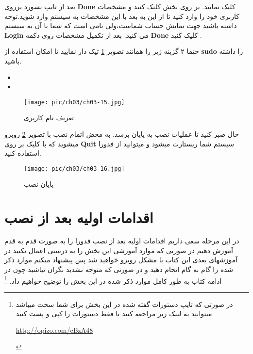 بعد از تایپ پسورد برروی 
 \textbf{Done}
 کلیک نمایید.
 بر روی بخش 
 کلیک کنید و مشخصات کاربری خود را وارد کنید تا از این به بعد با این مشخصات به سیستم وارد شوید.توجه داشته باشید 
 جهت نمایش حساب شماست،ولی 
 نامی است که شما با آن به سیستم 
 \textbf{Login}
  می کنید.   
 بعد از تکمیل مشخصات روی دکمه 
  \textbf{Done}
  کلیک کنید .
  \begin{tcolorbox}

حتما ۲ گزینه زیر را همانند تصویر
\ref{pic-15} \label{user-name}
تیک دار نمایید تا امکان استفاده از 
\textbf{sudo}
را داشته باشید.
\begin{LTR}
\begin{itemize}
	\item {}
	\item {}
\end{itemize}
\end{LTR}
  \end{tcolorbox}  
  \begin{figure}[H]%
  	\caption{تعریف نام کاربری}
  	\begin{center}
  		\texttt{[image: pic/ch03/ch03-15.jpg]}
  	\end{center}
  	\label{pic-15}
  \end{figure} 
حال صبر کنید تا عملیات نصب به پایان برسد. به محض اتمام نصب با تصویر
\ref{pic-16}
روبرو میشوید که با کلیک بر روی 
\textbf{Quit}
سیستم شما ریستارت میشود و میتوانید از فدورا استفاده کنید.
 \begin{figure}[H]%
	\caption{پایان نصب}
	\begin{center}
		\texttt{[image: pic/ch03/ch03-16.jpg]}
	\end{center}
	\label{pic-16}
\end{figure} 
\section{اقدامات اولیه بعد از نصب}\label{se-23}
در این مرحله سعی داریم اقدامات اولیه بعد از نصب فدورا  را به صورت قدم به قدم آموزش دهیم در صورتی که موارد آموزشی این بخش را به درستی اعمال نکنید در آموزشهای بعدی این کتاب با مشکل روبرو خواهید شد پس پیشنهاد میکنم موارد ذکر شده را گام به گام انجام دهید و در صورتی که متوجه نشدید نگران نباشید چون در ادامه کتاب به طور کامل موارد ذکر شده در این بخش را توضیح خواهیم داد.
\footnote{در صورتی که تایپ دستورات گفته شده در این بخش برای شما سخت میباشد میتوانید به لینک زیر مراجعه کنید تا فقط دستورات را کپی و پست کنید
	\begin{flushleft}
		\href{http://www.linuxfedora.ir/viewtopic.php?f=9\&t=92}{http://opizo.com/cBzA48}
	\end{flushleft}
}
